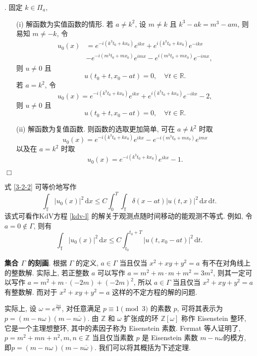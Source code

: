 \documentclass[master]{cugthesis}
\newcommand\R{\ensuremath{\mathbb{R}}}
\newcommand\Z{\ensuremath{\mathbb{Z}}}
\newcommand\T{\ensuremath{\mathbb{T}}}
\renewcommand\d{\ensuremath{\,\mathrm{d}}}
\newenvironment{proof}{{\noindent\itshape 证明}.}{\hfill $\Box$\par}
\begin{document}
\begin{proof}
    固定 $k\in \Pi_a$, 
    \begin{enumerate}
    \item [(i)] 解函数为实值函数的情形. 若 $a\neq k^2$, 设 $m\neq k$ 且 $k^3-ak=m^3-am$, 则易知 $m\neq -k$, 令
    \begin{align*}
        u_0(x)&= e^{-i(k^3t_0+kx_0)} e^{ikx} + e^{i(k^3t_0+kx_0)} e^{-ikx}\\
        &-e^{-i(m^3t_0+mx_0)}e^{imx}-e^{i(m^3t_0+mx_0)}e^{-imx},
    \end{align*}
    则 $u\neq 0$ 且
    \begin{equation*}
        u(t_0+t,x_0-at)=0,\quad\forall t\in \R.
    \end{equation*}
    若 $a=k^2$, 令
    \begin{equation*}
        u_0(x)=e^{-i(k^3t_0+kx_0)}e^{ikx} + e^{i(k^3t_0+kx_0)}e^{-ikx}-2,
    \end{equation*}
    则 $u\neq 0$ 且
    \begin{equation*}
        u(t_0+t,x_0-at)=0,\quad\forall t\in\R.
    \end{equation*}
    \item [(ii)] 解函数为复值函数. 则函数的选取更加简单, 可在 $a\neq k^2$ 时取 $$u_0(x)= e^{-i(k^3t_0+kx_0)} e^{ikx}-e^{-i(m^3t_0+mx_0)}e^{imx}$$以及在 $a=k^2$ 时取 $$u_0(x)=e^{-i(k^3t_0+kx_0)}e^{ikx} -1.$$
    \end{enumerate}
    \end{proof}
    

    式 \eqref{3-2-2} 可等价地写作
    \begin{equation*}
        \int_{\T}|u_0(x)|^2\d x\le C\int_0^T\int_{\T}\delta(x-at)|u(t,x)|^2\d x\d t.
    \end{equation*}
    该式可看作KdV方程 \eqref{kdv-l} 的解关于观测点随时间移动的能观测不等式. 例如, 令 $a=0\notin \Gamma$, 则有
    \begin{equation*}
        \int_{\T}|u_0(x)|^2\d x\le C\int_{t_0}^{t_0+T} |u(t,x_0-at)|^2\d t.
    \end{equation*}
 

 {\bf 集合 $\Gamma$ 的刻画}. 根据 $\Gamma$ 的定义, $a\in\Gamma$ 当且仅当 $x^2+xy+y^2=a$ 有不在对角线上的整数解. 实际上, 若正整数 $a$ 可以写作 $a=m^2+m\cdot m+m^2=3m^2$, 则其一定可以写作 $a=m^2+m\cdot (-2m)+(-2m)^2$, 所以 $a\in\Gamma$ 当且仅当 $x^2+xy+y^2=a$ 有整数解. 而对于 $x^2+xy+y^2=a$ 这样的不定方程的解的问题.
 
 实际上, 设 $\omega=e^{\frac{2\pi i}{3}}$, 对任意满足 $p\equiv 1\pmod{3}$ 的素数 $p$, 可将其表示为 $p=(m-n\omega)(m-n\overline{\omega})$. 由 $\Z$ 和 $\omega$ 扩张成的环 $\Z[\omega]$ 称作 Eisenstein 整环, 它是一个主理想整环, 其中的素因子称为 Eisenstein 素数. Fermat 等人证明了, $p=m^2+mn+n^2,m,n\in\Z$ 当且仅当素数 $p$ 是 Eisenstein 素数 $m-n\omega$的模方, 即$p=(m-n\omega)(m-n\overline{\omega})$. 我们可以将其概括为下述定理.
 
\end{document}
